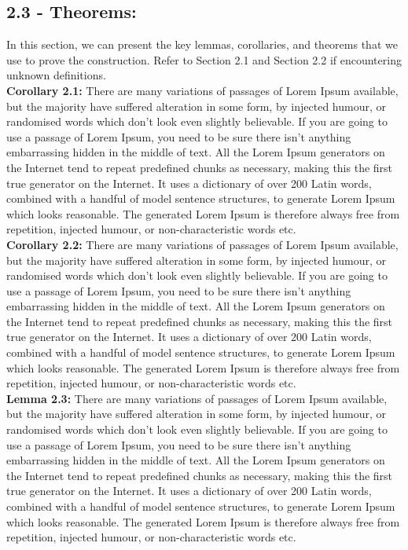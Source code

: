 \documentclass[letterpaper]{article} %
\begin{document}
	\subsection{2.3 - Theorems:}
	In this section, we can present the key lemmas, corollaries, and theorems that we use to prove the construction. Refer to Section 2.1 and Section 2.2 if encountering unknown definitions. \\
	
	\noindent\textbf{Corollary 2.1:} There are many variations of passages of Lorem Ipsum available, but the majority have suffered alteration in some form, by injected humour, or randomised words which don't look even slightly believable. If you are going to use a passage of Lorem Ipsum, you need to be sure there isn't anything embarrassing hidden in the middle of text. All the Lorem Ipsum generators on the Internet tend to repeat predefined chunks as necessary, making this the first true generator on the Internet. It uses a dictionary of over 200 Latin words, combined with a handful of model sentence structures, to generate Lorem Ipsum which looks reasonable. The generated Lorem Ipsum is therefore always free from repetition, injected humour, or non-characteristic words etc. \\
	
	
	\noindent\textbf{Corollary 2.2:} There are many variations of passages of Lorem Ipsum available, but the majority have suffered alteration in some form, by injected humour, or randomised words which don't look even slightly believable. If you are going to use a passage of Lorem Ipsum, you need to be sure there isn't anything embarrassing hidden in the middle of text. All the Lorem Ipsum generators on the Internet tend to repeat predefined chunks as necessary, making this the first true generator on the Internet. It uses a dictionary of over 200 Latin words, combined with a handful of model sentence structures, to generate Lorem Ipsum which looks reasonable. The generated Lorem Ipsum is therefore always free from repetition, injected humour, or non-characteristic words etc. \\
	
	\noindent\textbf{Lemma 2.3:} There are many variations of passages of Lorem Ipsum available, but the majority have suffered alteration in some form, by injected humour, or randomised words which don't look even slightly believable. If you are going to use a passage of Lorem Ipsum, you need to be sure there isn't anything embarrassing hidden in the middle of text. All the Lorem Ipsum generators on the Internet tend to repeat predefined chunks as necessary, making this the first true generator on the Internet. It uses a dictionary of over 200 Latin words, combined with a handful of model sentence structures, to generate Lorem Ipsum which looks reasonable. The generated Lorem Ipsum is therefore always free from repetition, injected humour, or non-characteristic words etc. \\
	
\end{document}
